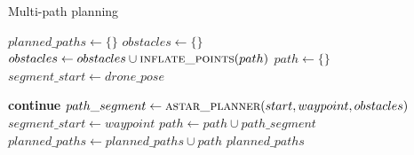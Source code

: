 \begin{algorithm}[!h]
\caption{Multi-path planning}\label{alg:cap}
\begin{algorithmic}

  \State $planned\_paths \gets \{\}$
   
    \State $obstacles \gets \{\}$
      \State $obstacles \gets obstacles \cup \Call{inflate\_points}{path}$ %
    \EndFor
    \State $path \gets \{\}$
    \State $segment\_start \gets drone\_pose$

        \State \textbf{continue}
      \EndIf
      \State $path\_segment \gets \Call{astar\_planner}{start, waypoint, obstacles}$
      \State $segment\_start \gets waypoint$
      \State $path \gets path \cup path\_segment$
    \EndFor
    \State $planned\_paths \gets planned\_paths \cup path$
  \EndFor
  \State \Return $planned\_paths$
\EndFunction


\end{algorithmic}
  \label{alg:planning}
\end{algorithm}%





